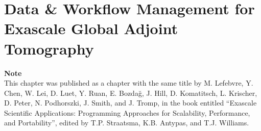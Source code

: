 \chapter[Data \& Workflow Management for Exascale Global Adjoint Tomography]{Data \& Workflow Management for Exascale Global Adjoint Tomography}

\textbf{Note}\\
This chapter was published as a chapter with the same title by
M. Lefebvre, Y. Chen, W. Lei, D. Luet, Y. Ruan, E. Bozda\u g, J. Hill,
D. Komatitsch, L. Krischer, D. Peter, N. Podhorszki, J. Smith, and J. Tromp,
in the book entitled ``Exascale Scientific Applications: Programming Approaches
for Scalability, Performance, and Portability'', edited by T.P. Straatsma, K.B. Antypas, and T.J. Williams.












%
